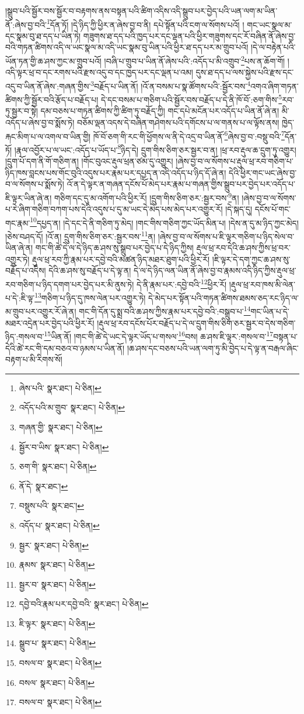 །སྒྲུབ་པའི་སྦྱོར་བས་སྦྱོར་བ་བརྟགས་ནས་བསྟན་པའི་ཚིག་འདིས་འདི་སྒྲུབ་པར་བྱེད་པའི་ཡན་ལག་མ་ཡིན་ནོ་:ཞེས་བྱ་བའི་\footnote{ཞེས་པའི་  སྣར་ཐང་།  པེ་ཅིན། }དོན་ཏོ། །དེ་ཉིད་ཀྱི་ཕྱིར་ན་ཞེས་བྱ་བ་ནི། དཔེ་སྟོན་པའི་ངག་ལ་སོགས་པའོ། །
གང་ཡང་སྣལ་མ་དང་སྣམ་བུ་ཐ་དད་པ་ཡིན་ཏེ། གཟུགས་ཐ་དད་པའི་ཁྱད་པར་དང་ལྡན་པའི་ཕྱིར་གཟུགས་དང་རོ་བཞིན་ནོ་ཞེས་བྱ་བའི་གཏན་ཚིགས་འདི་ལ་ཡང་སྣལ་མ་འདི་ཡང་སྣམ་བུ་ཡིན་པའི་ཕྱིར་ཐ་དད་པར་མ་གྲུབ་པའོ། །དེ་ལ་བརྟེན་པའི་ཡོན་ཏན་གྱི་ཆ་ཤས་ཀྱང་མ་གྲུབ་པའོ། །བཞི་པ་གྲུབ་པ་ཡིན་ནོ་ཞེས་པའི་:འདོད་པ་མི་འགྲུབ་\footnote{འདོད་པའི་མ་གྲུབ་  སྣར་ཐང་།  པེ་ཅིན། }པས་ན་ཆོག་གོ། །འདི་ལྟར་ཕྲ་བ་དང་རགས་པའི་རྫས་འདུ་བ་དང་ཁྱད་པར་དང་ལྡན་པ་འམ། དུས་ཐ་དད་པ་ལས་སྐྱེས་པའི་རྫས་དང་འདུ་བ་ཡིན་ནོ་ཞེས་:གཞན་གྱིས་\footnote{གཞན་གྱི་  སྣར་ཐང་།  པེ་ཅིན། }བརྗོད་པ་ཡིན་ནོ། །འོ་ན་བསམ་པ་སྣ་ཚོགས་པའི་:སྦྱོར་བས་\footnote{སྦྱོར་བ་ཡིས་  སྣར་ཐང་།  པེ་ཅིན། }འགའ་ཞིག་གཏན་ཚིགས་ཀྱི་སྦྱོར་བའི་རྩོད་པ་བརྗོད་པ། དེ་དང་བསམ་པ་གཅིག་པའི་སྦྱོར་བས་བརྗོད་པ་དེ་ནི་ཁོ་བོ་:ཅག་གིས་\footnote{ཅག་གི་  སྣར་ཐང་།  པེ་ཅིན། }རབ་ཏུ་སྦྱར་བ་སྟེ། དམ་བཅས་པ་གཏན་ཚིགས་ཀྱི་ཚིག་ཏུ་བརྗོད་ཀྱི། གང་དཔེ་མངོན་པར་འདོད་པ་ཡིན་ནོ་ཞེ་ན། མི་འདོད་པ་ཞེས་བྱ་བ་སྨོས་ཏེ། བཅོམ་ལྡན་འདས་དེ་བཞིན་གཤེགས་པའི་དགོངས་པ་ལ་གནས་པ་ལ་ལྟོས་ནས། ཁྱེད་རྐང་མིག་པ་ལ་འགལ་བ་ཡིན་གྱི། ཁོ་བོ་ཅག་གི་རང་གི་ཕྱོགས་ལ་ནི་དེ་འདྲ་བ་ཡིན་ནོ་\footnote{ནོ་དེ་  སྣར་ཐང་། }ཞེས་བྱ་བ་:བསྡུ་བའི་\footnote{བསྡུས་པའི་  སྣར་ཐང་། }དོན་ཏོ། །རྣལ་འབྱོར་པ་ལ་ཡང་:འདོད་པ་ཡོད་པ་\footnote{འདོད་པ་  སྣར་ཐང་།  པེ་ཅིན། }ཉིད་དེ། དྲུག་གིས་ཅིག་ཅར་སྦྱར་བ་ན། །ཕྲ་རབ་རྡུལ་ཆ་དྲུག་ཏུ་འགྱུར། །དྲུག་པོ་དག་ནི་གོ་གཅིག་ན། །གོང་བུའང་རྡུལ་ཕྲན་ཙམ་དུ་འགྱུར། །ཞེས་བྱ་བ་ལ་སོགས་པ་རྡུལ་ཕྲ་རབ་གཅིག་པ་ཉིད་ཁས་བླངས་པས་གོང་བུའི་འདུས་པར་རྣམ་པར་དཔྱད་ན་འདི་འདོད་པ་ཉིད་དོ་ཞེ་ན། དེའི་ཕྱིར་གང་ཡང་ཞེས་བྱ་བ་ལ་སོགས་པ་སྨོས་ཏེ། འོ་ན་དེ་ལྟར་ན་གཞན་དངོས་པོ་མེད་པར་རྣམ་པ་གཞན་གྱིས་སྒྲུབ་པར་བྱེད་པར་འདོད་པ་ཇི་ལྟར་ཡིན་ཞེ་ན། གཅིག་དང་དུ་མ་འགོག་པའི་ཕྱིར་རོ། །དྲུག་གིས་ཅིག་ཅར་:སྦྱར་བས་\footnote{སྦྱར་  སྣར་ཐང་།  པེ་ཅིན། }ན། །ཞེས་བྱ་བ་ལ་སོགས་པ་རེ་ཞིག་གཅིག་བཀག་པས་དེའི་འདུས་པ་དུ་མ་ཡང་དེ་མེད་པས་མེད་པར་འགྱུར་རོ། །དེ་སྐད་དུ། དངོས་པོ་གང་གང་རྣམ་\footnote{རྣམས་  སྣར་ཐང་།  པེ་ཅིན། }དཔྱད་ན། །དེ་དང་དེ་ནི་གཅིག་ཏུ་མེད། །གང་གིས་གཅིག་ཀྱང་ཡོད་མིན་པ། །དེས་ན་དུ་མ་ཉིད་ཀྱང་མེད། །ཅེས་བཤད་དོ། །འོ་ན། དྲུག་གིས་ཅིག་ཅར་:སྦྱར་བས་\footnote{སྦྱར་བ་  སྣར་ཐང་།  པེ་ཅིན། }ན། །ཞེས་བྱ་བ་ལ་སོགས་པ་ཇི་ལྟར་གཅིག་པ་ཉིད་སེལ་བ་ཡིན་ཞེ་ན། གང་གི་ཚེ་དེ་ལ་དེ་ཉིད་ཆ་ཤས་སུ་སྒྲུབ་པར་བྱེད་པ་དེ་ཉིད་ཀྱིས། རྡུལ་ཕྲ་རབ་དེའི་ཆ་ཤས་ཀྱིས་ཕྲ་བར་འགྱུར་ཏེ། རྡུལ་ཕྲ་རབ་ཀྱི་རྣམ་པར་དབྱེ་བའི་མཚན་ཉིད་མཐར་ཐུག་པའི་ཕྱིར་རོ། །ཇི་ལྟར་དེ་དག་ཀྱང་ཆ་ཤས་སུ་བརྗོད་པ་འདིས། དེའི་ཆ་ཤས་སུ་བརྗོད་པ་དེ་ལྟ་ན། དེ་ལ་དེ་ཉིད་ལན་ཡིན་ནོ་ཞེས་བྱ་བ་རྣམས་འདི་ཉིད་ཀྱིས་རྡུལ་ཕྲ་རབ་གཅིག་པ་ཉིད་དགག་པར་བྱེད་པར་མི་ནུས་ཏེ། དེ་ནི་རྣམ་པར་:དབྱེ་བའི་\footnote{དབྱེ་བའི་རྣམ་པར་དབྱེ་བའི་  སྣར་ཐང་།  པེ་ཅིན། }ཕྱིར་རོ། །རྡུལ་ཕྲ་རབ་ཁས་མི་ལེན་པ་དེ་:ཇི་ལྟ་\footnote{ཇི་ལྟར་  སྣར་ཐང་།  པེ་ཅིན། }གཅིག་པ་ཉིད་དུ་ཁས་ལེན་པར་འགྱུར་ཏེ། དེ་མེད་པར་སྟོན་པའི་གཏན་ཚིགས་ཐམས་ཅད་རང་ཉིད་ལ་མ་གྲུབ་པར་འགྱུར་རོ་ཞེ་ན། གང་གི་དོན་དུ་སྨྲ་བའི་ཆ་ཤས་ཀྱིས་རྣམ་པར་དབྱེ་བའི་:བསྒྲུབ་པ་\footnote{སྒྲུབ་པ་  སྣར་ཐང་།  པེ་ཅིན། }གང་ཡིན་པ་དེ་མཐར་འདྲེན་པར་བྱེད་པའི་ཕྱིར་རོ། །རྡུལ་ཕྲ་རབ་དངོས་པོར་བརྗོད་པ་དེ་ལ་དྲུག་གིས་ཅིག་ཅར་སྦྱར་བ་དེས་གཅིག་ཉིད་:གསལ་བ་\footnote{བསལ་བ་  སྣར་ཐང་།  པེ་ཅིན། }ཡིན་ནོ། །གང་གི་ཚེ་དེ་ཡང་དེ་ལྟར་ཡོད་པ་གསལ་\footnote{བསལ་  སྣར་ཐང་།  པེ་ཅིན། }བས། ཆ་ཤས་ཇི་ལྟར་:གསལ་བ་\footnote{བསལ་བ་  སྣར་ཐང་།  པེ་ཅིན། }བསྟན་པ་དེའི་ཚེ་རང་གི་དམ་བཅའ་བ་ཉམས་པ་ཡིན་ནོ། །ཆ་ཤས་དང་བཅས་པའི་ཡན་ལག་ཏུ་མི་བྱེད་པ་དེ་ལྟ་ན་བརྒལ་ཞིང་བརྟག་པ་མི་རིགས་སོ། 